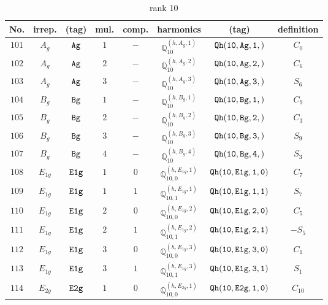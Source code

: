 \documentclass[fleqn,8pt]{jsarticle}
\begin{document}
\begin{table}[ht!]
\begin{center}
\caption{rank 10}
\renewcommand{\arraystretch}{1.3}
\begin{tabular}{cccccccc} \hline \hline
No. & irrep. & (tag) & mul. & comp. & harmonics & (tag) & definition \\ \hline
$ 101 $ & $ A_{g} $ & $ {\tt Ag} $ & $ 1 $ & $ - $ & $ \mathbb{Q}_{10}^{(h,A_{g},1)} $ & $ {\tt Qh(10,Ag,1,)} $ & $ C_{0} $ \\
$ 102 $ & $ A_{g} $ & $ {\tt Ag} $ & $ 2 $ & $ - $ & $ \mathbb{Q}_{10}^{(h,A_{g},2)} $ & $ {\tt Qh(10,Ag,2,)} $ & $ C_{6} $ \\
$ 103 $ & $ A_{g} $ & $ {\tt Ag} $ & $ 3 $ & $ - $ & $ \mathbb{Q}_{10}^{(h,A_{g},3)} $ & $ {\tt Qh(10,Ag,3,)} $ & $ S_{6} $ \\
$ 104 $ & $ B_{g} $ & $ {\tt Bg} $ & $ 1 $ & $ - $ & $ \mathbb{Q}_{10}^{(h,B_{g},1)} $ & $ {\tt Qh(10,Bg,1,)} $ & $ C_{9} $ \\
$ 105 $ & $ B_{g} $ & $ {\tt Bg} $ & $ 2 $ & $ - $ & $ \mathbb{Q}_{10}^{(h,B_{g},2)} $ & $ {\tt Qh(10,Bg,2,)} $ & $ C_{3} $ \\
$ 106 $ & $ B_{g} $ & $ {\tt Bg} $ & $ 3 $ & $ - $ & $ \mathbb{Q}_{10}^{(h,B_{g},3)} $ & $ {\tt Qh(10,Bg,3,)} $ & $ S_{9} $ \\
$ 107 $ & $ B_{g} $ & $ {\tt Bg} $ & $ 4 $ & $ - $ & $ \mathbb{Q}_{10}^{(h,B_{g},4)} $ & $ {\tt Qh(10,Bg,4,)} $ & $ S_{3} $ \\
$ 108 $ & $ E_{1g} $ & $ {\tt E1g} $ & $ 1 $ & $ 0 $ & $ \mathbb{Q}_{10,0}^{(h,E_{1g},1)} $ & $ {\tt Qh(10,E1g,1,0)} $ & $ C_{7} $ \\
$ 109 $ & $ E_{1g} $ & $ {\tt E1g} $ & $ 1 $ & $ 1 $ & $ \mathbb{Q}_{10,1}^{(h,E_{1g},1)} $ & $ {\tt Qh(10,E1g,1,1)} $ & $ S_{7} $ \\
$ 110 $ & $ E_{1g} $ & $ {\tt E1g} $ & $ 2 $ & $ 0 $ & $ \mathbb{Q}_{10,0}^{(h,E_{1g},2)} $ & $ {\tt Qh(10,E1g,2,0)} $ & $ C_{5} $ \\
$ 111 $ & $ E_{1g} $ & $ {\tt E1g} $ & $ 2 $ & $ 1 $ & $ \mathbb{Q}_{10,1}^{(h,E_{1g},2)} $ & $ {\tt Qh(10,E1g,2,1)} $ & $ - S_{5} $ \\
$ 112 $ & $ E_{1g} $ & $ {\tt E1g} $ & $ 3 $ & $ 0 $ & $ \mathbb{Q}_{10,0}^{(h,E_{1g},3)} $ & $ {\tt Qh(10,E1g,3,0)} $ & $ C_{1} $ \\
$ 113 $ & $ E_{1g} $ & $ {\tt E1g} $ & $ 3 $ & $ 1 $ & $ \mathbb{Q}_{10,1}^{(h,E_{1g},3)} $ & $ {\tt Qh(10,E1g,3,1)} $ & $ S_{1} $ \\
$ 114 $ & $ E_{2g} $ & $ {\tt E2g} $ & $ 1 $ & $ 0 $ & $ \mathbb{Q}_{10,0}^{(h,E_{2g},1)} $ & $ {\tt Qh(10,E2g,1,0)} $ & $ C_{10} $ \\

\end{tabular}
\end{center}
\end{table}
\end{document}
